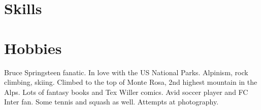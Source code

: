 \documentclass[a4paper]{moderncv}
\begin{document}

%
%
%
%
%
%
%
%

\section{Skills}


\section{Hobbies}
Bruce Springsteen fanatic. In love with the US National Parks.
Alpinism, rock climbing, skiing.  Climbed to the top of Monte Rosa, 2nd highest mountain in the Alps. Lots of fantasy books and Tex Willer comics.  Avid soccer player and FC Inter fan. Some tennis and squash as well. 
 Attempts at photography.%



 
\end{document}
